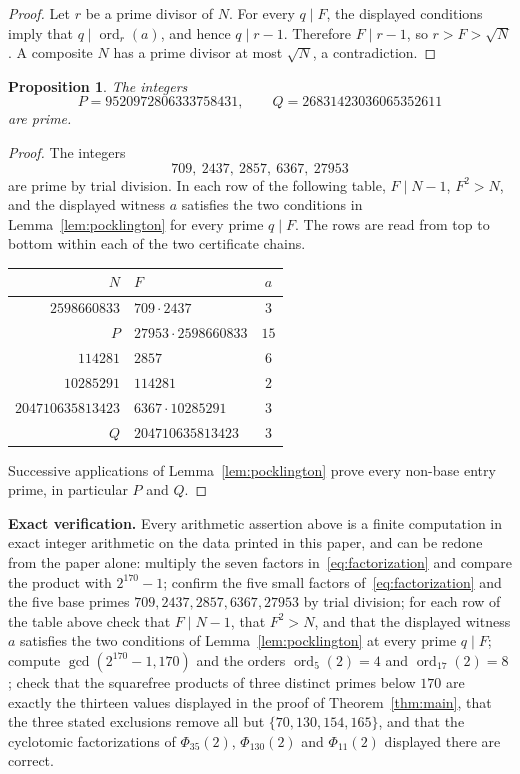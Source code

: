 \documentclass[11pt]{amsart}
\newtheorem{proposition}[theorem]{Proposition}
\theoremstyle{remark}
\DeclareMathOperator{\ord}{ord}
\begin{document}
\begin{proof}
Let $r$ be a prime divisor of $N$. For every $q\mid F$, the displayed
conditions imply that $q\mid\ord_r(a)$, and hence $q\mid r-1$.
Therefore $F\mid r-1$, so $r>F>\sqrt N$. A composite $N$ has a prime
divisor at most $\sqrt N$, a contradiction.
\end{proof}

\begin{proposition}\label{prop:large-primes}
The integers
\[
P=9520972806333758431,
\qquad
Q=26831423036065352611
\]
are prime.
\end{proposition}

\begin{proof}
The integers
\[
709,\ 2437,\ 2857,\ 6367,\ 27953
\]
are prime by trial division. In each row of the following table,
$F\mid N-1$, $F^2>N$, and the displayed witness $a$ satisfies the two
conditions in Lemma~\ref{lem:pocklington} for every prime $q\mid F$.
The rows are read from top to bottom within each of the two certificate
chains.

\begin{center}
\small
\renewcommand{\arraystretch}{1.15}
\begin{tabular}{r@{\qquad}l@{\qquad}c}
\toprule
$N$ & $F$ & $a$\\
\midrule
$2598660833$ & $709\cdot2437$ & $3$\\
$P$ & $27953\cdot2598660833$ & $15$\\[1mm]
$114281$ & $2857$ & $6$\\
$10285291$ & $114281$ & $2$\\
$204710635813423$ & $6367\cdot10285291$ & $3$\\
$Q$ & $204710635813423$ & $3$\\
\bottomrule
\end{tabular}
\end{center}

Successive applications of Lemma~\ref{lem:pocklington} prove every
non-base entry prime, in particular $P$ and $Q$.
\end{proof}

\medskip
\noindent
\textbf{Exact verification.}
Every arithmetic assertion above is a finite computation in exact
integer arithmetic on the data printed in this paper, and can be redone
from the paper alone: multiply the seven factors
in~\eqref{eq:factorization} and compare the product with $2^{170}-1$;
confirm the five small factors of~\eqref{eq:factorization} and the five
base primes $709,2437,2857,6367,27953$ by trial division; for each row
of the table above check that $F\mid N-1$, that $F^2>N$, and that the
displayed witness $a$ satisfies the two conditions of
Lemma~\ref{lem:pocklington} at every prime $q\mid F$; compute
$\gcd(2^{170}-1,170)$ and the orders $\ord_5(2)=4$ and
$\ord_{17}(2)=8$; check that the squarefree products of three distinct
primes below $170$ are exactly the thirteen values displayed in the
proof of Theorem~\ref{thm:main}, that the three stated exclusions
remove all but $\{70,130,154,165\}$, and that the cyclotomic
factorizations of $\Phi_{35}(2)$, $\Phi_{130}(2)$ and $\Phi_{11}(2)$
displayed there are correct.
\end{document}
